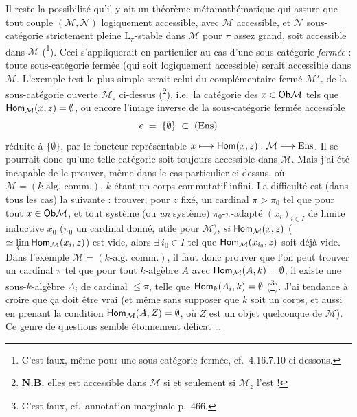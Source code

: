 Il reste la possibilité qu'il y ait un théorème métamathématique qui assure que tout couple $(\mathcal{M},\mathcal{N})$ logiquement accessible, avec $\mathcal{M}$ accessible, et $\mathcal{N}$ sous-catégorie strictement pleine $\mathrm{L}_\pi$-stable dans $\mathcal{M}$ pour $\pi$ assez grand, soit accessible dans $\mathcal{M}$ (\footnote[188]{C'est faux, même pour une sous-catégorie fermée, cf.\ 4.16.7.10 ci-dessous.}). Ceci s'appliquerait en particulier au cas d'une sous-catégorie \textit{fermée} : toute sous-catégorie fermée (qui soit logiquement accessible) serait accessible dans $\mathcal{M}$. L'exemple-test le plus simple serait celui du complémentaire fermé $\mathcal{M}'_z$ de la sous-catégorie ouverte $\mathcal{M}_z$ ci-dessus (\footnote[189]{\textbf{N.B.} elles est accessible dans $\mathcal{M}$ si et seulement si $\mathcal{M}_z$ l'est ! %
}), i.e.\ la catégorie des $x \in \mathsf{Ob}\mathcal{M}$ tels que $\mathsf{Hom}_{\mathcal{M}}(x,z) = \emptyset$, ou encore
l'image inverse de la sous-catégorie fermée accessible
\[
e \;=\; \{\emptyset\} \;\subset\; (\mathrm{Ens})
\]
réduite à $\{\emptyset\}$, par le foncteur représentable $x \longmapsto \mathsf{Hom}(x,z) : \mathcal{M} \longrightarrow \mathrm{Ens}$. Il se pourrait donc qu'une telle catégorie soit toujours accessible dans $\mathcal{M}$. Mais j'ai été incapable de le
prouver, même dans le cas particulier ci-dessus, où $\mathcal{M} = (k\text{-alg.\ comm.})$, $k$ étant un corps commutatif infini. La difficulté est (dans tous les cas) la suivante : trouver, pour $z$ fixé, un cardinal $\pi > \pi_0$ tel que pour tout $x \in \mathsf{Ob}\mathcal{M}$, et tout système (ou \textit{un} système) $\pi_0$-$\pi$-adapté $(x_i)_{i\in I}$ de limite inductive $x_0$ ($\pi_0$ un cardinal donné, utile pour $\mathcal{M}$), \textit{si} $\mathsf{Hom}_{\mathcal{M}}(x,z)$ ($\simeq \varprojlim \mathsf{Hom}_{\mathcal{M}}(x_i,z)$) est vide, alors $\exists\ i_0 \in I$ tel que $\mathsf{Hom}_{\mathcal{M}}(x_{i_0},z)$ soit déjà vide. Dans l'exemple $\mathcal{M} = (k\text{-alg.\ comm.})$, il faut donc prouver que l'on peut trouver un cardinal $\pi$
tel que pour tout $k$-algèbre $A$ avec $\mathsf{Hom}_{\mathcal{M}}(A,k) = \emptyset$, il existe une sous-$k$-algèbre $A_i$ de %
cardinal $\leqslant \pi$, telle que $\mathsf{Hom}_k(A_i,k) = \emptyset$ (\footnote[190]{C'est faux, cf.\ annotation marginale p.~466.}). J'ai tendance à croire que ça doit être vrai (et même sans
supposer que $k$ soit un corps, et aussi en prenant la condition $\mathsf{Hom}_{\mathcal{M}}(A,Z) = \emptyset$, où $Z$ est un objet quelconque de $\mathcal{M}$). Ce genre de questions semble étonnement délicat \dots %

